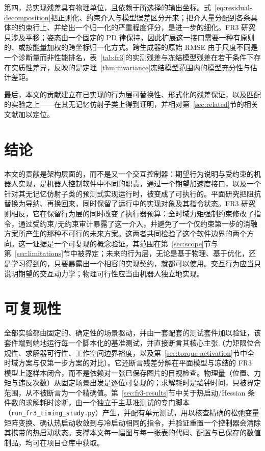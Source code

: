 \documentclass[journal]{IEEEtran}
\begin{document}
第四，总实现残差具有物理单位，且依赖于所选择的输出坐标。式~\eqref{eq:residual-decomposition}把正则化、约束介入与模型误差区分开来；把介入量分配到各条具体的约束行上、并给出一个归一化的严重程度评分，是进一步的细化。FR3 研究只涉及平移；姿态由一个固定的 PD 律保持，因此扩展这一接口需要一种有原则的、或按能量加权的跨坐标归一化方式。跨生成器的原始 RMSE 由于尺度不同是一个诊断量而非性能排名，表~\ref{tab:fr3}的实测残差与冻结模型残差在若干条件下存在实质性差异，反映的是定理~\ref{thm:invariance}冻结模型范围内的模型充分性与估计差距。

最后，本文的贡献建立在已实现的行为层可替换性、形式化的残差保证，以及匹配的实验之上——在其无记忆仿射子类上得到证明，并相对第~\ref{sec:related}节的相关文献加以定位。

\section{结论}

本文的贡献是架构层面的，而不是又一个交互控制器：期望行为说明与受约束的机器人实现，是机器人控制软件中不同的职责，通过一个期望加速度接口，以及一个针对其无记忆仿射子类的预测式实现运行时，被变成了可执行的。平面研究把阻抗替换为导纳、再换回来，同时保留了运行中的实现对象及其指令状态。FR3 研究则相反，它在保留行为层的同时改变了执行器预算：全时域力矩强制约束修改了指令，通过受约束/无约束审计暴露了这一介入，并避免了一个仅约束第一步的消融方案所产生的那种不可行的未来方案。这两者共同检验了这个软件边界的两个方向。这一证据是一个可复现的概念验证，其范围在第~\ref{sec:scope}节与第~\ref{sec:limitations}节中被界定；未来的行为层，无论是基于物理、基于优化，还是学习得到的，只要暴露出一个相容的实现契约，就都可以使用。交互行为应当只说明期望的交互动力学；物理可行性应当由机器人独立地实现。

\section*{可复现性}

全部实验都由固定的、确定性的场景驱动，并由一套配套的测试套件加以验证，该套件端到端地运行每一个脚本化的基准测试，并直接断言其核心主张（力矩限位合规性、求解器可行性、工作空间边界裕度，以及第~\ref{sec:torque-activation}节中全时域方案与仅第一步方案的对比）。它还断言残差分解在平面模型与冻结的 FR3 模型上逐样本闭合，而不是依赖对一张已保存图片的目视检查。物理量（位置、力矩与违反次数）从固定场景出发是逐位可复现的；求解耗时是墙钟时间，只被界定范围，从不被断言为一个精确值。第~\ref{sec:fr3-results}节中关于热启动/Hessian 条件数的求解耗时诊断，由一个独立于主基准测试的专门脚本（\texttt{run\_fr3\_timing\_study.py}）产生，并配有单元测试，用以核查精确的松弛变量矩阵变换、确认热启动收敛到与冷启动相同的指令，并验证重置一个控制器会清除其携带的热启动状态。支撑本文每一幅图与每一张表的代码、配置与已保存的数值制品，均可在项目仓库中获取。
\end{document}
